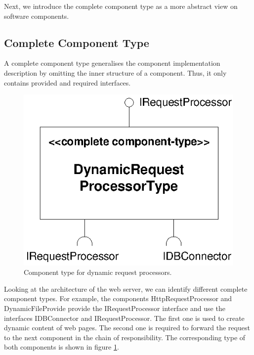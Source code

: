 Next, we introduce the complete component type as a more abstract view on
software components.


\subsection*{Complete Component Type}

A complete component type generalises the component implementation description
by omitting the inner structure of a component. Thus, it only contains provided
and required interfaces.

\begin{figure}[htbp]
\centering
\includegraphics[scale=0.85]{example/DynamicRequestProcessorType}
\caption{Component type for dynamic request processors.}
\label{fig:DynamicRequestProcessorType}
\end{figure}

Looking at the architecture of the web server, we can identify different
complete component types. For example, the components HttpRequestProcessor and
DynamicFileProvide provide the IRequestProcessor interface and use the
interfaces IDBConnector and IRequestProcessor. The first one is used to create
dynamic content of web pages. The second one is required to forward the request
to the next component in the chain of responsibility. The corresponding type of
both components is shown in figure \ref{fig:DynamicRequestProcessorType}.

